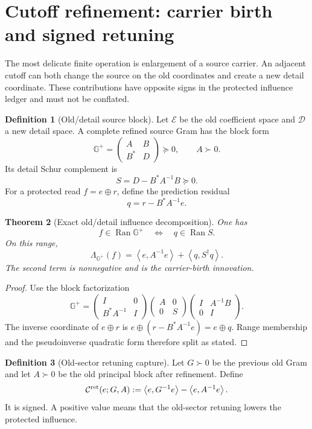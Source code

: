 \documentclass[11pt]{article}
\newtheorem{theorem}{Theorem}[section]
\theoremstyle{definition}
\newtheorem{definition}[theorem]{Definition}
\theoremstyle{remark}
\newcommand{\Ran}{\operatorname{Ran}}
\newcommand{\ip}[2]{\left\langle#1,#2\right\rangle}
\begin{document}
\section{Cutoff refinement: carrier birth and signed retuning}
\label{sec:gran-refinement}

The most delicate finite operation is enlargement of a source carrier.  An
adjacent cutoff can both change the source on the old coordinates and create a
new detail coordinate.  These contributions have opposite signs in the
protected influence ledger and must not be conflated.

\begin{definition}[Old/detail source block]
Let $\mathcal E$ be the old coefficient space and $\mathcal D$ a new detail
space.  A complete refined source Gram has the block form
\[
 \mathbb G^+
 =\begin{pmatrix}A&B\\B^*&D\end{pmatrix}\succeq0,
 \qquad A\succ0.
\]
Its detail Schur complement is
\[
 S=D-B^*A^{-1}B\succeq0.
\]
For a protected read $f=e\oplus r$, define the prediction residual
\[
 q=r-B^*A^{-1}e.
\]
\end{definition}

\begin{theorem}[Exact old/detail influence decomposition]
\label{thm:gran-old-detail}
One has
\[
 f\in\Ran\mathbb G^+
 \quad\Longleftrightarrow\quad
 q\in\Ran S.
\]
On this range,
\[
 \Lambda_{\mathbb G^+}(f)
 =\ip{e}{A^{-1}e}+\ip{q}{S^\dagger q}.
\]
The second term is nonnegative and is the carrier-birth innovation.
\end{theorem}

\begin{proof}
Use the block factorization
\[
 \mathbb G^+
 =\begin{pmatrix}I&0\\B^*A^{-1}&I\end{pmatrix}
  \begin{pmatrix}A&0\\0&S\end{pmatrix}
  \begin{pmatrix}I&A^{-1}B\\0&I\end{pmatrix}.
\]
The inverse coordinate of $e\oplus r$ is
$e\oplus(r-B^*A^{-1}e)=e\oplus q$.  Range membership and the pseudoinverse
quadratic form therefore split as stated.
\end{proof}

\begin{definition}[Old-sector retuning capture]
Let $G\succ0$ be the previous old Gram and let $A\succ0$ be the old principal
block after refinement.  Define
\[
 \mathcal C^{\rm ret}(e;G,A)
 :=\ip{e}{G^{-1}e}-\ip{e}{A^{-1}e}.
\]
It is signed.  A positive value means that the old-sector retuning lowers the
protected influence.
\end{definition}
\end{document}
